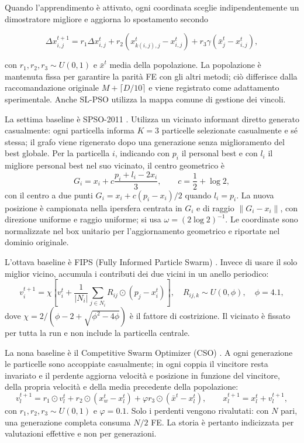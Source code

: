 Quando l'apprendimento è attivato, ogni coordinata sceglie indipendentemente un
dimostratore migliore e aggiorna lo spostamento secondo

\begin{equation}
 \Delta x_{i,j}^{t+1}=r_1\Delta x_{i,j}^{t}
 +r_2(x_{k(i,j),j}^{t}-x_{i,j}^{t})
 +r_3\gamma(\bar{x}_{j}^{t}-x_{i,j}^{t}),
 \label{eq:slpso-update}
\end{equation}

con $r_1,r_2,r_3\sim U(0,1)$ e $\bar{x}^{t}$ media della popolazione. La
popolazione è mantenuta fissa per garantire la parità FE con gli altri metodi;
ciò differisce dalla raccomandazione originale $M+\lceil D/10\rceil$ e viene
registrato come adattamento sperimentale. Anche SL-PSO utilizza la mappa comune
di gestione dei vincoli.

La settima baseline è SPSO-2011 \citep{ZambranoBigiarini2013}. Utilizza un
vicinato informant diretto generato casualmente: ogni particella informa $K=3$
particelle selezionate casualmente e sé stessa; il grafo viene rigenerato dopo
una generazione senza miglioramento del best globale. Per la particella $i$,
indicando con $p_i$ il personal best e con $l_i$ il migliore personal best nel
suo vicinato, il centro geometrico è
\begin{equation}
 G_i=x_i+c\frac{p_i+l_i-2x_i}{3},\qquad c=\frac12+\log 2,
 \label{eq:spso-gravity}
\end{equation}
con il centro a due punti $G_i=x_i+c(p_i-x_i)/2$ quando $l_i=p_i$. La nuova
posizione è campionata nella ipersfera centrata in $G_i$ e di raggio
$\|G_i-x_i\|$, con direzione uniforme e raggio uniforme; si usa
$\omega=(2\log2)^{-1}$. Le coordinate sono normalizzate nel box unitario
per l'aggiornamento geometrico e riportate nel dominio originale.

L'ottava baseline è FIPS (Fully Informed Particle Swarm)
\citep{MendesKennedyNeves2004}. Invece di usare il solo miglior vicino,
accumula i contributi dei due vicini in un anello periodico:
\begin{equation}
 v_i^{t+1}=\chi\left[v_i^t+\frac{1}{|N_i|}
 \sum_{j\in N_i}R_{ij}\odot(p_j-x_i^t)\right],
 \quad R_{ij,k}\sim U(0,\phi),\quad \phi=4.1,
 \label{eq:fips-ring}
\end{equation}
dove $\chi=2/(\phi-2+\sqrt{\phi^2-4\phi})$ è il fattore di
costrizione. Il vicinato è fissato per tutta la run e non include la particella
centrale.

La nona baseline è il Competitive Swarm Optimizer (CSO)
\citep{Cheng2015}. A ogni generazione le particelle sono accoppiate casualmente;
in ogni coppia il vincitore resta invariato e il perdente aggiorna velocità e
posizione in funzione del vincitore, della propria velocità e della media
precedente della popolazione:
\begin{equation}
 v_l^{t+1}=r_1\odot v_l^t+r_2\odot(x_w^t-x_l^t)
 +\varphi r_3\odot(\bar x^t-x_l^t),\qquad
 x_l^{t+1}=x_l^t+v_l^{t+1},
 \label{eq:cso-update}
\end{equation}
con $r_1,r_2,r_3\sim U(0,1)$ e $\varphi=0.1$. Solo i perdenti vengono
rivalutati: con $N$ pari, una generazione completa consuma $N/2$ FE. La storia
è pertanto indicizzata per valutazioni effettive e non per generazioni.

